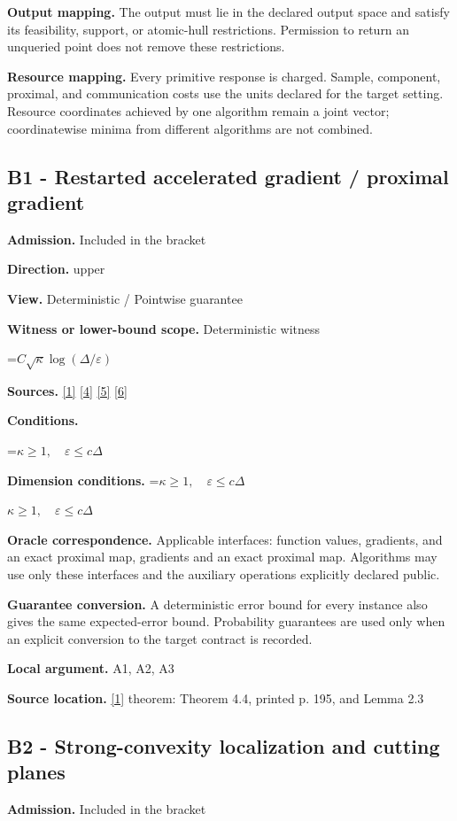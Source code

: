 \documentclass[10pt,a4paper]{article}
\newcommand{\AtlasMath}[1]{\par\begingroup\centering\setbox0=\hbox{$\displaystyle #1$}\ifdim\wd0>1.4\linewidth\typeout{ATLAS WIDE FORMULA: \the\wd0}\fi\ifdim\wd0>\linewidth\resizebox{\linewidth}{!}{\box0}\else\box0\fi\par\endgroup}
\newcommand{\AtlasInlineMath}[1]{\begingroup\setbox0=\hbox{$#1$}\ifdim\wd0>.4\linewidth\endgroup\AtlasMath{#1}\else\endgroup$#1$\fi}
\begin{document}
\textbf{Output mapping.} The output must lie in the declared output space and satisfy its feasibility, support, or atomic-hull restrictions. Permission to return an unqueried point does not remove these restrictions.

\textbf{Resource mapping.} Every primitive response is charged. Sample, component, proximal, and communication costs use the units declared for the target setting. Resource coordinates achieved by one algorithm remain a joint vector; coordinatewise minima from different algorithms are not combined.

\subsection{B1 - Restarted accelerated gradient / proximal gradient}
\textbf{Admission.} Included in the bracket

\textbf{Direction.} upper

\textbf{View.} Deterministic / Pointwise guarantee

\textbf{Witness or lower-bound scope.} Deterministic witness

\AtlasMath{C\sqrt\kappa\log(\Delta/\varepsilon)}
\textbf{Sources.} \href{https://www.tau.ac.il/~becka/FISTA.pdf}{[1]} \href{https://arxiv.org/pdf/1405.4980}{[4]} \href{https://www2.isye.gatech.edu/~nemirovs/MOR_AccuracyCertificates.pdf}{[5]} \href{https://arxiv.org/pdf/2609.20701}{[6]}

\textbf{Conditions.} 
\AtlasMath{\kappa\ge1,\quad\varepsilon\le c\Delta}


\textbf{Dimension conditions.} \AtlasInlineMath{\kappa\ge1,\quad\varepsilon\le c\Delta}

\textbf{Oracle correspondence.} Applicable interfaces: function values, gradients, and an exact proximal map, gradients and an exact proximal map. Algorithms may use only these interfaces and the auxiliary operations explicitly declared public.

\textbf{Guarantee conversion.} A deterministic error bound for every instance also gives the same expected-error bound. Probability guarantees are used only when an explicit conversion to the target contract is recorded.

\textbf{Local argument.} A1, A2, A3

\textbf{Source location.} \href{https://www.tau.ac.il/~becka/FISTA.pdf}{[1]} theorem: Theorem 4.4, printed p. 195, and Lemma 2.3

\subsection{B2 - Strong-convexity localization and cutting planes}
\textbf{Admission.} Included in the bracket
\end{document}
